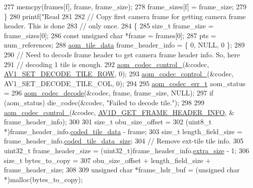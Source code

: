 \begin{DoxyCodeInclude}
{{{{{277     memcpy(frames[f], frame, frame\_size);
278     frame\_sizes[f] = frame\_size;
279   \}
280   printf(\textcolor{stringliteral}{"Read %
281 
282   \textcolor{comment}{// Copy first camera frame for getting camera frame header. This is done}
283   \textcolor{comment}{// only once.}
284   \{
285     \textcolor{keywordtype}{size\_t} frame\_size = frame\_sizes[0];
286     \textcolor{keyword}{const} \textcolor{keywordtype}{unsigned} \textcolor{keywordtype}{char} *frame = frames[0];
287     pts = num\_references;
288     \hyperlink{structaom__tile__data}{aom\_tile\_data} frame\_header\_info = \{ 0, NULL, 0 \};
289 
290     \textcolor{comment}{// Need to decode frame header to get camera frame header info. So, here}
291     \textcolor{comment}{// decoding 1 tile is enough.}
292     \hyperlink{group__codec_ga51eb332a40dcacc39000ab8e0be36b79}{aom\_codec\_control\_}(&codec, \hyperlink{group__aom__decoder_gga3865fd4b3192489baa9a5c3632ebe97bac056b4cf80427fd05e3c4c9fc46edb78}{AV1\_SET\_DECODE\_TILE\_ROW}, 0);
293     \hyperlink{group__codec_ga51eb332a40dcacc39000ab8e0be36b79}{aom\_codec\_control\_}(&codec, AV1\_SET\_DECODE\_TILE\_COL, 0);
294 
295     \hyperlink{group__codec_gaaae61e0f8663e6137f1e228757248e7c}{aom\_codec\_err\_t} aom\_status =
296         \hyperlink{group__decoder_gab03fdb999d1f83a5896869a3ba5f68f7}{aom\_codec\_decode}(&codec, frame, frame\_size, NULL);
297     \textcolor{keywordflow}{if} (aom\_status) die\_codec(&codec, \textcolor{stringliteral}{"Failed to decode tile."});
298 
299     \hyperlink{group__codec_ga51eb332a40dcacc39000ab8e0be36b79}{aom\_codec\_control\_}(&codec, \hyperlink{group__aom__decoder_gga3865fd4b3192489baa9a5c3632ebe97baed16ed4514ea1bd2847e607ca880b246}{AV1D\_GET\_FRAME\_HEADER\_INFO}, &
      frame\_header\_info);
300 
301     \textcolor{keywordtype}{size\_t} obu\_size\_offset =
302         (uint8\_t *)frame\_header\_info.\hyperlink{structaom__tile__data_a05898249ddaf5ba799dd471113b0e51e}{coded\_tile\_data} - frame;
303     \textcolor{keywordtype}{size\_t} length\_field\_size = frame\_header\_info.\hyperlink{structaom__tile__data_a4451b0bcd81b4959484745df35a9fbba}{coded\_tile\_data\_size};
304     \textcolor{comment}{// Remove ext-tile tile info.}
305     uint32\_t frame\_header\_size = (uint32\_t)frame\_header\_info.\hyperlink{structaom__tile__data_a936851e515bcea0af38d2d091f5adf65}{extra\_size} - 1;
306     \textcolor{keywordtype}{size\_t} bytes\_to\_copy =
307         obu\_size\_offset + length\_field\_size + frame\_header\_size;
308 
309     \textcolor{keywordtype}{unsigned} \textcolor{keywordtype}{char} *frame\_hdr\_buf = (\textcolor{keywordtype}{unsigned} \textcolor{keywordtype}{char} *)malloc(bytes\_to\_copy);
}}}}}}
\end{DoxyCodeInclude}
